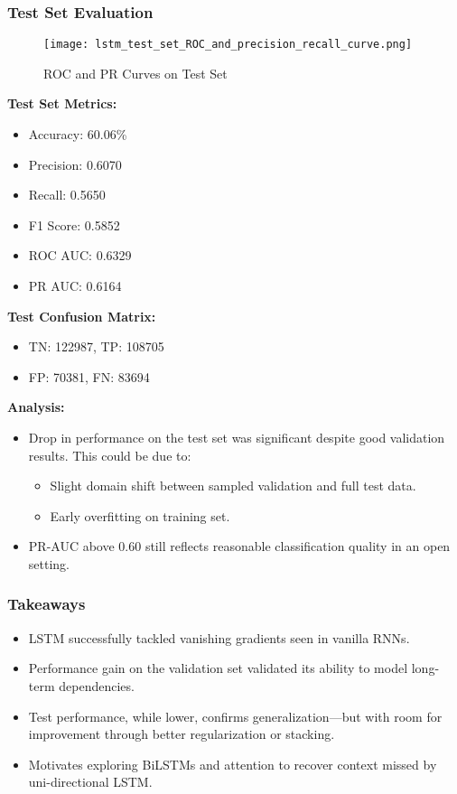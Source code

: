 \documentclass[12pt]{article}
\begin{document}
\subsubsection*{Test Set Evaluation}

\begin{figure}[H]
    \centering
    \texttt{[image: lstm\_test\_set\_ROC\_and\_precision\_recall\_curve.png]}
    \caption{ROC and PR Curves on Test Set}
\end{figure}

\textbf{Test Set Metrics:}
\begin{itemize}
    \item Accuracy: 60.06\%
    \item Precision: 0.6070
    \item Recall: 0.5650
    \item F1 Score: 0.5852
    \item ROC AUC: 0.6329
    \item PR AUC: 0.6164
\end{itemize}

\textbf{Test Confusion Matrix:}
\begin{itemize}
    \item TN: 122987, TP: 108705
    \item FP: 70381, FN: 83694
\end{itemize}

\textbf{Analysis:}
\begin{itemize}
    \item Drop in performance on the test set was significant despite good validation results. This could be due to:
    \begin{itemize}
        \item Slight domain shift between sampled validation and full test data.
        \item Early overfitting on training set.
    \end{itemize}
    \item PR-AUC above 0.60 still reflects reasonable classification quality in an open setting.
\end{itemize}

\subsubsection*{Takeaways}
\begin{itemize}
    \item LSTM successfully tackled vanishing gradients seen in vanilla RNNs.
    \item Performance gain on the validation set validated its ability to model long-term dependencies.
    \item Test performance, while lower, confirms generalization—but with room for improvement through better regularization or stacking.
    \item Motivates exploring BiLSTMs and attention to recover context missed by uni-directional LSTM.
\end{itemize}
\end{document}

